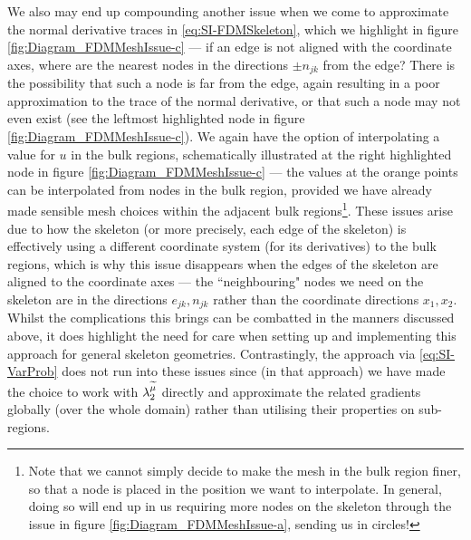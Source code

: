 We also may end up compounding another issue when we come to approximate the normal derivative traces in \eqref{eq:SI-FDMSkeleton}, which we highlight in figure \ref{fig:Diagram_FDMMeshIssue-c} --- if an edge is not aligned with the coordinate axes, where are the nearest nodes in the directions $\pm n_{jk}$ from the edge?
There is the possibility that such a node is far from the edge, again resulting in a poor approximation to the trace of the normal derivative, or that such a node may not even exist (see the leftmost highlighted node in figure \ref{fig:Diagram_FDMMeshIssue-c}).
We again have the option of interpolating a value for $u$ in the bulk regions, schematically illustrated at the right highlighted node in figure \ref{fig:Diagram_FDMMeshIssue-c} --- the values at the orange points can be interpolated from nodes in the bulk region, provided we have already made sensible mesh choices within the adjacent bulk regions\footnote{Note that we cannot simply decide to make the mesh in the bulk region finer, so that a node is placed in the position we want to interpolate. In general, doing so will end up in us requiring more nodes on the skeleton through the issue in figure \ref{fig:Diagram_FDMMeshIssue-a}, sending us in circles!}.
These issues arise due to how the skeleton (or more precisely, each edge of the skeleton) is effectively using a different coordinate system (for its derivatives) to the bulk regions, which is why this issue disappears when the edges of the skeleton are aligned to the coordinate axes --- the ``neighbouring" nodes we need on the skeleton are in the directions $e_{jk}, n_{jk}$ rather than the coordinate directions $x_1, x_2$.
Whilst the complications this brings can be combatted in the manners discussed above, it does highlight the need for care when setting up and implementing this approach for general skeleton geometries.
Contrastingly, the approach via \eqref{eq:SI-VarProb} does not run into these issues since (in that approach) we have made the choice to work with $\lambda_2^{\widetilde{\mu}}$ directly and approximate the related gradients globally (over the whole domain) rather than utilising their properties on sub-regions.

